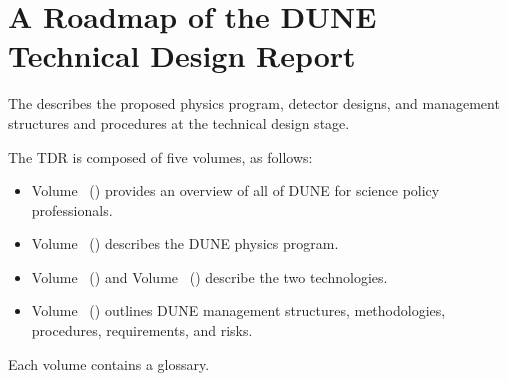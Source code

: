 \cleardoublepage
\section*{A Roadmap of the DUNE Technical Design Report}

The   describes the proposed physics program,  
detector designs, and management structures and procedures at the technical design stage.  

The TDR is composed of five volumes, as follows:

\begin{itemize}
\item Volume~\volnumberexec{} (\voltitleexec{}) provides an overview of all of DUNE for science policy professionals.

\item Volume~\volnumberphysics{} (\voltitlephysics{}) describes the DUNE physics program.

\item Volume~\volnumbersp{} (\voltitlesp{}) and Volume~\volnumberdp{} (\voltitledp{}) describe the two   technologies.

\item Volume~\volnumbertc{} (\voltitletc{}) outlines DUNE management structures, methodologies, procedures, requirements, and risks. 
\end{itemize}

Each volume contains a glossary.

\cleardoublepage



